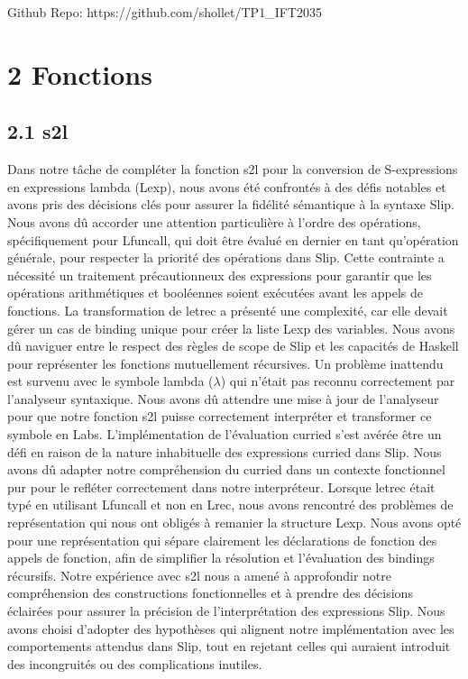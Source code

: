 \documentclass[10pt]{article}
\begin{document}
Github Repo: https://github.com/shollet/TP1\_IFT2035

\section*{2 Fonctions}
\subsection*{2.1 s2l}
Dans notre tâche de compléter la fonction s2l pour la conversion de S-expressions en expressions lambda (Lexp), nous avons été confrontés à des défis notables et avons pris des décisions clés pour assurer la fidélité sémantique à la syntaxe Slip. Nous avons dû accorder une attention particulière à l'ordre des opérations, spécifiquement pour Lfuncall, qui doit être évalué en dernier en tant qu'opération générale, pour respecter la priorité des opérations dans Slip. Cette contrainte a nécessité un traitement précautionneux des expressions pour garantir que les opérations arithmétiques et booléennes soient exécutées avant les appels de fonctions. La transformation de letrec a présenté une complexité, car elle devait gérer un cas de binding unique pour créer la liste Lexp des variables. Nous avons dû naviguer entre le respect des règles de scope de Slip et les capacités de Haskell pour représenter les fonctions mutuellement récursives. Un problème inattendu est survenu avec le symbole lambda ($\lambda$) qui n'était pas reconnu correctement par l'analyseur syntaxique. Nous avons dû attendre une mise à jour de l'analyseur pour que notre fonction s2l puisse correctement interpréter et transformer ce symbole en Labs. L'implémentation de l'évaluation curried s'est avérée être un défi en raison de la nature inhabituelle des expressions curried dans Slip. Nous avons dû adapter notre compréhension du curried dans un contexte fonctionnel pur pour le refléter correctement dans notre interpréteur. Lorsque letrec était typé en utilisant Lfuncall et non en Lrec, nous avons rencontré des problèmes de représentation qui nous ont obligés à remanier la structure Lexp. Nous avons opté pour une représentation qui sépare clairement les déclarations de fonction des appels de fonction, afin de simplifier la résolution et l'évaluation des bindings récursifs. Notre expérience avec s2l nous a amené à approfondir notre compréhension des constructions fonctionnelles et à prendre des décisions éclairées pour assurer la précision de l'interprétation des expressions Slip. Nous avons choisi d'adopter des hypothèses qui alignent notre implémentation avec les comportements attendus dans Slip, tout en rejetant celles qui auraient introduit des incongruités ou des complications inutiles.
\end{document}
